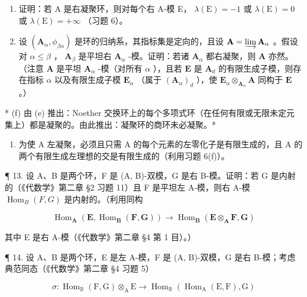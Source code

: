 \begin{enumerate}
\def\labelenumi{(\alph{enumi})}
\setcounter{enumi}{3}
\item
  证明：若 A 是右凝聚环，则对每个右 A-模 E， \(\lambda(\mathrm{E}) = -1\) 或 \(\lambda(\mathrm{E}) = 0\) 或 \(\lambda(\mathrm{E}) = +\infty\) （习题 6）。
\item
设 \((\mathbf{A}_{\alpha}, \phi_{\beta \alpha})\) 是环的归纳系，其指标集是定向的，且设 \(\mathbf{A} = \varinjlim \mathbf{A}_{\alpha}\) 。假设对 \(\alpha \leqslant \beta\) ， \(\mathbf{A}_{\beta}\) 是平坦右 \(\mathbf{A}_{\alpha}\) -模。证明：若诸 \(\mathbf{A}_{\alpha}\) 都右凝聚，则 \(\mathbf{A}\) 亦然。（注意 \(\mathbf{A}\) 是平坦 \(\mathbf{A}_{\alpha}\) -模（对所有 \(\alpha\) ），且若 \(\mathbf{E}\) 是 \(\mathbf{A}_d\) 的有限生成子模，则存在指标 \(\alpha\) 以及有限生成子模 \(\mathbf{E}_{\alpha}\) （属于 \((\mathbf{A}_{\alpha})_d\) ），使 \(\mathbf{E}_{\alpha} \otimes_{\mathbf{A}_{\alpha}} \mathbf{A}\) 同构于 \(\mathbf{E}\) 。）
\end{enumerate}

* (f) 由 (e) 推出：Noether 交换环上的每个多项式环（在任何有限或无限未定元集上）都是凝聚的。由此推出：凝聚环的商环未必凝聚。*

\begin{enumerate}
\def\labelenumi{(\alph{enumi})}
\setcounter{enumi}{6}
\tightlist
\item
  为使 A 左凝聚，必须且只需 A 的每个元素的左零化子是有限生成的，且 A 的两个有限生成左理想的交是有限生成的（利用习题 6(f)）。
\end{enumerate}

¶ 13. 设 A、B 是两个环，F 是 (A, B)-双模，G 是右 B-模。证明：若 G 是内射的（《代数学》第二章 §2 习题 11）且 F 是平坦左 A-模，则右 A-模 \(\operatorname{Hom}_{B}(F, G)\) 是内射的。（利用同构

\[
\operatorname{Hom} _ {\mathbf {A}} (\mathbf {E}, \operatorname{Hom} _ {\mathbf {B}} (\mathbf {F}, \mathbf {G})) \rightarrow \operatorname{Hom} _ {\mathbf {B}} (\mathbf {E} \otimes_ {\mathbf {A}} \mathbf {F}, \mathbf {G})
\]

其中 E 是右 A-模（《代数学》第二章 §4 第 1 目）。）

¶ 14. 设 A、B 是两个环，E 是左 A-模，F 是 (A, B)-双模，G 是右 B-模；考虑典范同态（《代数学》第二章 §4 习题 5）

\[
\sigma \colon \operatorname{Hom} _ {\mathbb {B}} (\mathrm{F}, \mathrm{G}) \otimes_ {\mathrm{A}} \mathrm{E} \rightarrow \operatorname{Hom} _ {\mathbb {B}} (\operatorname{Hom} _ {\mathrm{A}} (\mathrm{E}, \mathrm{F}), \mathrm{G})
\]

